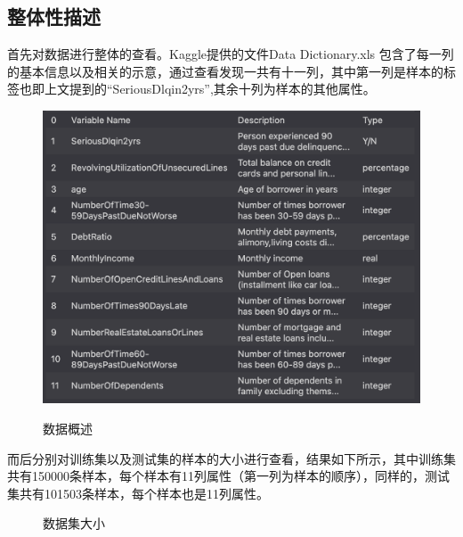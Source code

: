 \documentclass{zjureport}
\begin{document}
\subsection{整体性描述}
首先对数据进行整体的查看。Kaggle提供的文件Data Dictionary.xls 包含了每一列的基本信息以及相关的示意，通过查看发现一共有十一列，其中第一列是样本的标签也即上文提到的“SeriousDlqin2yrs”,其余十列为样本的其他属性。
    \begin{figure}[H]
    \centering
    \includegraphics[scale=0.8]{figures/image1.png}\\
    \caption{数据概述}
    \end{figure}
    
    而后分别对训练集以及测试集的样本的大小进行查看，结果如下所示，其中训练集共有150000条样本，每个样本有11列属性（第一列为样本的顺序），同样的，测试集共有101503条样本，每个样本也是11列属性。

    
    \begin{figure}[H]
    \centering  %
    \caption{数据集大小}
    \label{Fig.main}
    \end{figure}
\end{document}
